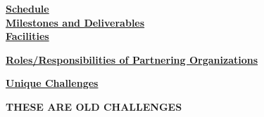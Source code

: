 \vspace*{.05in}\noindent \underline{\textbf{Schedule}} \\[-2ex]
 

\vspace*{.05in}\noindent \underline{\textbf{Milestones and Deliverables}} \\[-2ex]
 

\vspace*{.05in}\noindent \underline{\textbf{Facilities}}



\vspace*{.05in}\noindent \underline{\textbf{Roles/Responsibilities of 
Partnering Organizations}}




\vspace*{.05in}\noindent \underline{\textbf{Unique Challenges}}

\textbf{THESE ARE OLD CHALLENGES}

